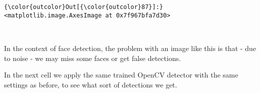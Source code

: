 \documentclass[11pt]{article}
\begin{document}
\begin{Verbatim}[commandchars=\\\{\}]
{\color{outcolor}Out[{\color{outcolor}87}]:} <matplotlib.image.AxesImage at 0x7f967bfa7d30>
\end{Verbatim}
            
    \begin{center}
    \end{center}
    { \hspace*{\fill} \\}
    
    In the context of face detection, the problem with an image like this is
that - due to noise - we may miss some faces or get false detections.

In the next cell we apply the same trained OpenCV detector with the same
settings as before, to see what sort of detections we get.
\end{document}
